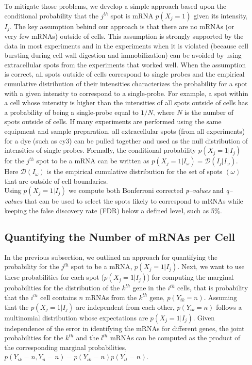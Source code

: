 \documentclass[10pt]{article}
\newcommand{\ith}{\ensuremath{i^{th} }\xspace	}
\newcommand{\jth}{\ensuremath{j^{th} }\xspace	}
\newcommand{\kth}{\ensuremath{k^{th} }\xspace	}
\newcommand{\lth}{\ensuremath{l^{th} }\xspace	}
\begin{document}
\begin{spacing}{1.5}
To mitigate those problems, we develop a simple approach based upon the conditional probability that the $j^{th}$ spot is mRNA $p(X_j=1)$ given its intensity, $I_j$. The key assumption behind our approach is that there are no mRNAs (or very few mRNAs) outside of cells. This assumption is strongly supported by the data in most experiments and in the experiments when it is violated (because cell bursting during cell wall digestion and immobilization) can be avoided by using extracellular spots from the experiments that worked well. When the assumption is correct, all spots outside of cells correspond to single probes and the empirical cumulative distribution of their intensities characterizes the probability for a spot with a given intensity to correspond to a single-probe. For example, a spot within a cell whose intensity is higher than the intensities of all spots outside of cells has a probability of being a single-probe equal to $1/N$, where $N$ is the number of spots outside of cells. If many experiments are performed using the same equipment and sample preparation, all extracellular spots (from all experiments) for a dye (such as cy3) can be pulled together and used as the null distribution of intensities of single probes. Formally, the conditional probability $p(X_j=1|I_j)$ for  the $j^{th}$ spot to be a mRNA can be written as $p(X_j=1|I_{\omega}) = \mathcal D(I_j|I_{\omega})$. Here $\mathcal D(I_{\omega})$ is the empirical cumulative distribution for the set of spots $(\omega)$ that are outside of cell boundaries. \\

Using $p(X_j=1|I_j)$ we compute both Bonferroni corrected \emph{p--values} and \emph{q--values} that can be used to select the spots likely to correspond to mRNAs while keeping the false discovery rate (FDR) below a defined level, such as 5\%.   


\subsection*{Quantifying the Number of mRNAs per Cell}
In the previous subsection, we outlined an approach for quantifying the probability for the \jth spot to be a mRNA, $p(X_j=1|I_j)$. Next, we want to use these probabilities for each spot ($p(X_j=1|I_j)$) for computing the marginal probabilities for the distribution of the \kth gene in the \ith cells, that is probability that the \ith cell contains $n$ mRNAs from the \kth gene, $p(Y_{ik}=n)$.  Assuming that the $p(X_j=1|I_j)$ are independent from each other,  $p(Y_{ik}=n)$ follows a multinomial distribution whose expectations are $p(X_j=1|I_j)$. Given independence of the error in identifying the mRNAs for different genes, the joint probabilities for the \kth and the \lth mRNAs can be computed as the product of the corresponding marginal probabilities,  $p(Y_{ik}=n, Y_{il}=n) = p(Y_{ik}=n) p(Y_{il}=n)$. 


\end{spacing}
\end{document}
